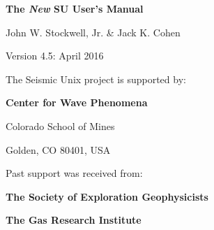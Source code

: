 %
%
%
\begin{titlepage}
\vspace*{2.3 in}
\centerline{\Huge \bf The {\em New\/} SU User's Manual}
\vspace{0.3in}
\centerline{\Large John W. Stockwell, Jr. \& Jack K. Cohen}
\vspace{0.5in}
\centerline{\Large Version 4.5: April 2016}

\vfill

\centerline{The Seismic Unix project is supported by:}
\vspace{3ex}
\centerline{\bf Center for Wave Phenomena}
\vspace{2ex}
\centerline{\epsfysize=0.675in }
\vspace{2ex}
\centerline{Colorado School of Mines}
\centerline{Golden, CO 80401, USA}
\vspace{2ex}
\centerline{Past support was received from:}
\vspace{2ex}
\centerline{\bf The Society of Exploration Geophysicists}
\vspace{2ex}
\centerline{\epsfysize=0.775in }
\vspace{2ex}
\vspace{2ex}
\centerline{\bf The Gas Research Institute}
\vspace{2ex}
\centerline{\epsfysize=0.475in }

\end{titlepage}
%
